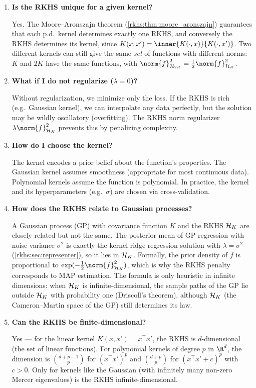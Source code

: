 \begin{notechapter}
\begin{enumerate}[label=\emph{Q\arabic*.}, leftmargin=*, itemsep=10pt]
\item \textbf{Is the RKHS unique for a given kernel?}

Yes. The Moore--Aronszajn theorem (\cref{rkhs:thm:moore_aronszajn})
guarantees that each p.d.\ kernel determines exactly one RKHS, and conversely the RKHS determines its kernel, since $K(x,x') = \inner{K(\cdot,x)}{K(\cdot,x')}$. Two different kernels can still give the same \emph{set} of functions with different norms: $K$ and $2K$ have the same functions, with $\norm{f}_{\mathcal H_{2K}}^2 = \frac12\norm{f}_{\hk}^2$.

\item \textbf{What if I do not regularize ($\lambda = 0$)?}

Without regularization, we minimize only the loss. If the RKHS is rich
(e.g.\ Gaussian kernel), we can interpolate any data perfectly, but the
solution may be wildly oscillatory (overfitting). The RKHS norm
regularizer $\lambda\norm{f}_{\hk}^2$ prevents this by penalizing
complexity.

\item \textbf{How do I choose the kernel?}

The kernel encodes a prior belief about the function's properties. The
Gaussian kernel assumes smoothness (appropriate for most continuous
data). Polynomial kernels assume the function is polynomial. In
practice, the kernel and its hyperparameters (e.g.\ $\sigma$) are chosen
via cross-validation.

\item \textbf{How does the RKHS relate to Gaussian processes?}

A Gaussian process (GP) with covariance function $K$ and the RKHS $\mathcal{H}_K$ are closely related but not the same. The posterior mean of GP regression with noise variance $\sigma^2$ is exactly the kernel ridge regression solution with $\lambda = \sigma^2$ (\cref{rkhs:sec:representer}), so it lies in $\mathcal{H}_K$. Formally, the prior density of $f$ is proportional to $\exp(-\frac12\norm{f}_{\hk}^2)$, which is why the RKHS penalty corresponds to MAP estimation. The formula is only heuristic in infinite dimensions: when $\mathcal{H}_K$ is infinite-dimensional, the sample paths of the GP lie outside $\mathcal{H}_K$ with probability one (Driscoll's theorem), although $\mathcal{H}_K$ (the Cameron--Martin space of the GP) still determines its law.

\item \textbf{Can the RKHS be finite-dimensional?}

Yes --- for the linear kernel $K(x,x') = x^\top x'$, the RKHS is
$d$-dimensional (the set of linear functions). For polynomial kernels of
degree $p$ in $\R^d$, the dimension is $\binom{d+p-1}{p}$ for $(x^\top x')^p$ and $\binom{d+p}{p}$ for $(x^\top x' + c)^p$ with $c > 0$. Only for
kernels like the Gaussian (with infinitely many non-zero Mercer
eigenvalues) is the RKHS infinite-dimensional.


\end{enumerate}
\end{notechapter}
